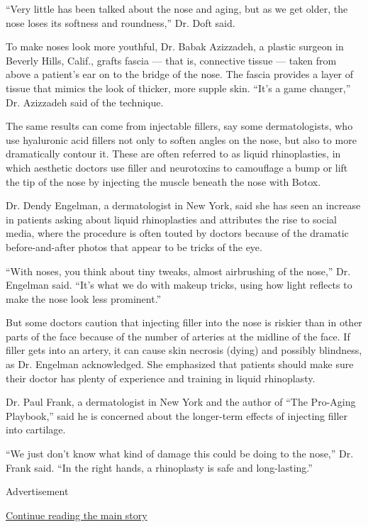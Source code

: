 ``Very little has been talked about the nose and aging, but as we get
older, the nose loses its softness and roundness,'' Dr. Doft said.

To make noses look more youthful, Dr. Babak Azizzadeh, a plastic surgeon
in Beverly Hills, Calif., grafts fascia --- that is, connective tissue
--- taken from above a patient's ear on to the bridge of the nose. The
fascia provides a layer of tissue that mimics the look of thicker, more
supple skin. ``It's a game changer,'' Dr. Azizzadeh said of the
technique.

The same results can come from injectable fillers, say some
dermatologists, who use hyaluronic acid fillers not only to soften
angles on the nose, but also to more dramatically contour it. These are
often referred to as liquid rhinoplasties, in which aesthetic doctors
use filler and neurotoxins to camouflage a bump or lift the tip of the
nose by injecting the muscle beneath the nose with Botox.

Dr. Dendy Engelman, a dermatologist in New York, said she has seen an
increase in patients asking about liquid rhinoplasties and attributes
the rise to social media, where the procedure is often touted by doctors
because of the dramatic before-and-after photos that appear to be tricks
of the eye.

``With noses, you think about tiny tweaks, almost airbrushing of the
nose,'' Dr. Engelman said. ``It's what we do with makeup tricks, using
how light reflects to make the nose look less prominent.''

But some doctors caution that injecting filler into the nose is riskier
than in other parts of the face because of the number of arteries at the
midline of the face. If filler gets into an artery, it can cause skin
necrosis (dying) and possibly blindness, as Dr. Engelman acknowledged.
She emphasized that patients should make sure their doctor has plenty of
experience and training in liquid rhinoplasty.

Dr. Paul Frank, a dermatologist in New York and the author of ``The
Pro-Aging Playbook,'' said he is concerned about the longer-term effects
of injecting filler into cartilage.

``We just don't know what kind of damage this could be doing to the
nose,'' Dr. Frank said. ``In the right hands, a rhinoplasty is safe and
long-lasting.''

Advertisement

\protect\hyperlink{after-bottom}{Continue reading the main story}

